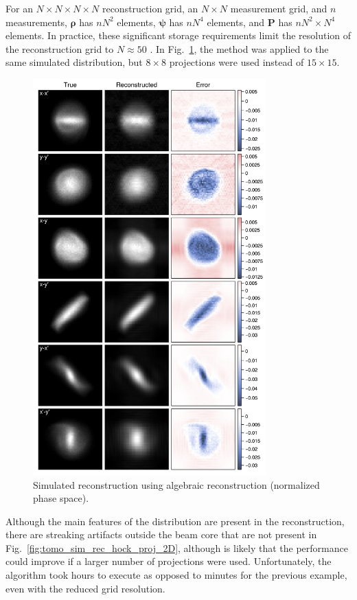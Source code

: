 For an $N \times N \times N \times N$ reconstruction grid, an $N \times N$ measurement grid, and $n$ measurements, $\bm{\rho}$ has $nN^2$ elements, $\bm{\psi}$ has $n N^4$ elements, and $\mathbf{P}$ has $n N^2 \times N^4$ elements. In practice, these significant storage requirements limit the resolution of the reconstruction grid to $N \approx 50$ \cite{Wolski2020}. In Fig.~\ref{fig:tomo_sim_rec_art_proj_2D}, the method was applied to the same simulated distribution, but $8 \times 8$ projections were used instead of $15 \times 15$.
%
\begin{figure}[!p]
    \centering
    \includegraphics[width=0.8\textwidth]{Images/chapter4/tomo_sim_rec_art_proj_2D_ver.png}
    \caption{Simulated reconstruction using algebraic reconstruction (normalized phase space).}
    \label{fig:tomo_sim_rec_art_proj_2D}
\end{figure}
%
Although the main features of the distribution are present in the reconstruction, there are streaking artifacts outside the beam core that are not present in Fig.~\ref{fig:tomo_sim_rec_hock_proj_2D}, although is likely that the performance could improve if a larger number of projections were used. Unfortunately, the algorithm took hours to execute as opposed to minutes for the previous example, even with the reduced grid resolution.



